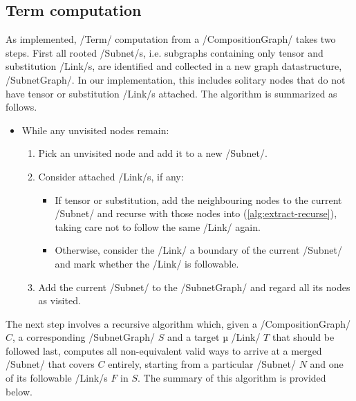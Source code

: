 \documentclass[12pt,a4paper]{article}
\begin{document}
\subsection{Term computation}

As implemented, \hs/Term/ computation from a \hs/CompositionGraph/ takes two steps. First all rooted \hs/Subnet/s, i.e. subgraphs containing only tensor and substitution \hs/Link/s, are identified and collected in a new graph datastructure, \hs/SubnetGraph/. In our implementation, this includes solitary nodes that do not have tensor or substitution \hs/Link/s attached. The algorithm is summarized as follows.
\begin{itemize}
    \item While any unvisited nodes remain:\begin{enumerate}
        \item Pick an unvisited node and add it to a new \hs/Subnet/.
        \item\label{alg:extract-recurse} Consider attached \hs/Link/s, if any:\begin{itemize}
            \item If tensor or substitution, add the neighbouring nodes to the current \hs/Subnet/ and recurse with those nodes into (\ref{alg:extract-recurse}), taking care not to follow the same \hs/Link/ again.
            \item Otherwise, consider the \hs/Link/ a boundary of the current \hs/Subnet/ and mark whether the \hs/Link/ is followable.
        \end{itemize}
        \item Add the current \hs/Subnet/ to the \hs/SubnetGraph/ and regard all its nodes as visited.
    \end{enumerate}
\end{itemize}
The next step involves a recursive algorithm which, given a \hs/CompositionGraph/ $C$, a corresponding \hs/SubnetGraph/ $S$ and a target µ \hs/Link/ $T$ that should be followed last, computes all non-equivalent valid ways to arrive at a merged \hs/Subnet/ that covers $C$ entirely, starting from a particular \hs/Subnet/ $N$ and one of its followable \hs/Link/s $F$ in $S$. The summary of this algorithm is provided below.
\end{document}
